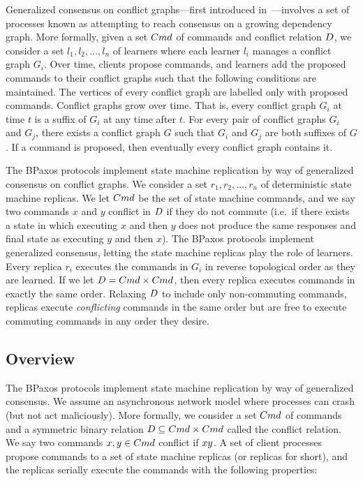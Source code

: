 Generalized consensus on conflict graphs---first introduced
in~\cite{lamport1998part}---involves a set of processes known as
 attempting to reach consensus on a growing dependency graph.
More formally, given a set $Cmd$ of commands and conflict relation
$D$, we consider a set $l_1, l_2, \ldots, l_n$ of learners where each
learner $l_i$ manages a conflict graph $G_i$. Over time, clients propose
commands, and learners add the proposed commands to their conflict graphs such
that the following conditions are maintained.
%
  The vertices of every conflict graph are labelled only with proposed
  commands.
%
  Conflict graphs grow over time. That is, every conflict graph $G_i$ at time
  $t$ is a suffix of $G_i$ at any time after $t$.
%
  For every pair of conflict graphs $G_i$ and $G_j$, there exists a conflict
  graph $G$ such that $G_i$ and $G_j$ are both suffixes of $G$.
%
  If a command is proposed, then eventually every conflict graph contains it.

The BPaxos protocols implement state machine replication by way of generalized
consensus on conflict graphs. We consider a set $r_1, r_2, \ldots, r_n$ of
deterministic state machine replicas. We let $Cmd$ be the set of state machine
commands, and we say two commands $x$ and $y$ conflict in $D$ if they
do not commute (i.e.\ if there exists a state in which executing $x$ and then
$y$ does not produce the same responses and final state as executing $y$ and
then $x$). The BPaxos protocols implement generalized consensus, letting the
state machine replicas play the role of learners. Every replica $r_i$ executes
the commands in $G_i$ in reverse topological order as they are learned. If we
let $D = Cmd \times Cmd$, then every replica executes commands in
exactly the same order. Relaxing $D$ to include only non-commuting
commands, replicas execute \emph{conflicting} commands in the same order but
are free to execute commuting commands in any order they desire.

\subsection{Overview}



\vspace{3in}

The BPaxos protocols implement state machine replication by way of generalized consensus. We assume an asynchronous network model where processes can crash (but not act maliciously). More formally, we consider a set $Cmd$ of commands and a symmetric binary relation $D \subseteq Cmd \times Cmd$ called the conflict relation. We say two commands $x, y \in Cmd$ conflict if $x  y$. A set of client processes propose commands to a set of state machine replicas (or replicas for short), and the replicas serially execute the commands with the following properties:





